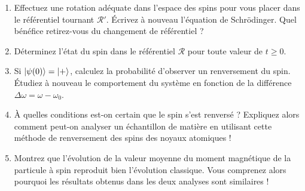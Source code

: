 \begin{enumerate}
\begin{enumerate}
\item Effectuez une rotation adéquate dans l'espace des spins pour vous placer dans le référentiel tournant $\mathcal R'$. Écrivez à nouveau l'équation de Schrödinger. Quel bénéfice retirez-vous du changement de référentiel ?
\item Déterminez l'état du spin dans le référentiel $\mathcal R$ pour toute valeur de $t\geq 0$.
\item Si $\ket{\psi(0)} = \ket{+}$, calculez la probabilité d'observer un renversement du spin. Étudiez à nouveau le comportement du système en fonction de la différence $\Delta\omega = \omega-\omega_0$.
\item À quelles conditions est-on certain que le spin s'est renversé ? Expliquez alors comment peut-on analyser un échantillon de matière en utilisant cette méthode de renversement des spins des noyaux atomiques !
\item Montrez que l'évolution de la valeur moyenne du moment magnétique de la particule à spin reproduit bien l'évolution classique. Vous comprenez alors pourquoi les résultats obtenus dans les deux analyses sont similaires !
\end{enumerate}

\end{enumerate}